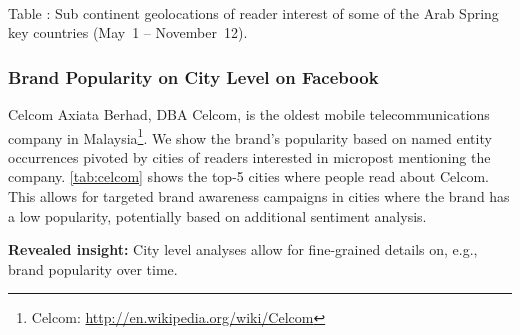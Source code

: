 \documentclass{iosart2c}
\newcommand{\tablecaption}[1]{%
  \\[1em]%
  \refstepcounter{table}%
  Table \arabic{table}: #1%
}
\begin{document}
\begin{table}
  \centering
  \qquad
    \tablecaption{Sub continent geolocations of reader interest of some of the Arab Spring key countries (May~1 -- November~12).}
  \label{tab:arabspring}
\end{table}

\subsubsection{Brand Popularity on City Level on Facebook}
Celcom Axiata Berhad, DBA Celcom, is the oldest mobile telecommunications company in Malaysia\footnote{Celcom: \url{http://en.wikipedia.org/wiki/Celcom}}.
We show the brand's popularity based on named entity occurrences pivoted by cities of readers interested in micropost mentioning the company.
\autoref{tab:celcom} shows the top-5 cities where people read about Celcom.
This allows for targeted brand awareness campaigns in cities where the brand has a low popularity, potentially based on additional sentiment analysis.

\textbf{Revealed insight:}
City level analyses allow for fine-grained details on, e.g., brand popularity over time.
\end{document}
